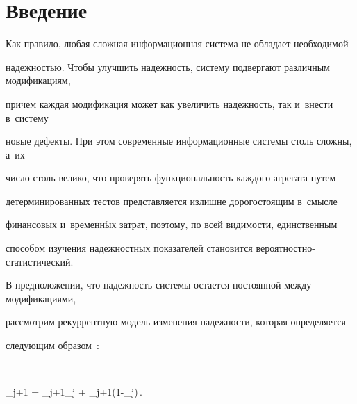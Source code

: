 















      \thispagestyle{headings}


      










\section{Введение}





Как правило, любая сложная информационная система не обладает необходимой 


надежностью. Чтобы улучшить надежность, систему подвергают различным модификациям, 


причем каждая модификация может как увеличить надежность, так и~внести в~систему 


новые дефекты. При этом современные информационные системы столь сложны, а~их 


число столь велико, что проверять функциональность каждого агрегата путем 


детерминированных тестов представляется излишне дорогостоящим в~смысле 


финансовых и~временн$\acute{\mbox{ы}}$х затрат, поэтому, по всей видимости, единственным 


способом изучения надежностных показателей становится ве\-ро\-ят\-ност\-но-ста\-ти\-сти\-че\-ский.





В предположении, что надежность системы остается постоянной между модификациями, 


рассмотрим рекуррентную модель изменения надежности, которая определяется 


следующим образом~\cite{KS2006}:


$$


\pi_{j+1} = \eta_{j+1}\pi_j + \theta_{j+1}\left(1-\pi_j\right)\,.


